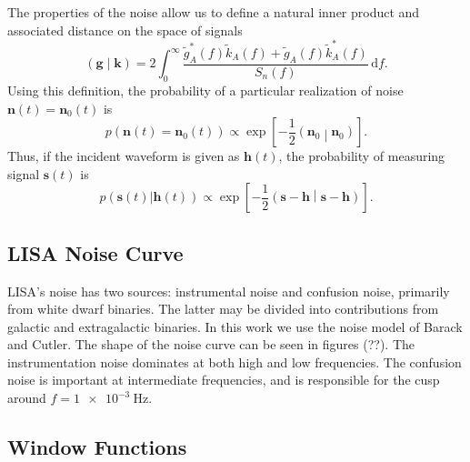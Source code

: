 \documentclass[a4paper, 11pt, titlepage, twoside]{report}
\newcommand{\recip}[1]{\ensuremath{\frac{1}{#1}}}
\newcommand{\innerprod}[2]{\ensuremath{\left({#1}\middle|{#2}\right)}}
\newcommand{\dd}{\ensuremath{\mathrm{d}}}
\newcommand{\intd}[4]{\ensuremath{\int_{#1}^{#2}{#3}\,\dd{#4}}}
\begin{document}
The properties of the noise allow us to define a natural inner product and associated distance on the space of signals\cite{Cutler1994}
\begin{equation}
\innerprod{\boldsymbol{g}}{\boldsymbol{k}} = 2\intd{0}{\infty}{\frac{\tilde{g}_A^*(f)\tilde{k}_A(f) + \tilde{g}_A(f)\tilde{k}_A^*(f)}{S_n(f)}}{f}.
\end{equation}
Using this definition, the probability of a particular realization of noise $\boldsymbol{n}(t) = \boldsymbol{n}_0(t)$ is
\begin{equation}
p(\boldsymbol{n}(t) = \boldsymbol{n}_0(t)) \propto \exp\left[-\recip{2}\innerprod{\boldsymbol{n}_0}{\boldsymbol{n}_0}\right].
\end{equation}
Thus, if the incident waveform is given as $\boldsymbol{h}(t)$, the probability of measuring signal $\boldsymbol{s}(t)$ is
\begin{equation}
p(\boldsymbol{s}(t)|\boldsymbol{h}(t)) \propto \exp\left[-\recip{2}\innerprod{\boldsymbol{s}-\boldsymbol{h}}{\boldsymbol{s}-\boldsymbol{h}}\right].
\label{eq:sig_prob}
\end{equation}

\subsection{LISA Noise Curve}\label{sec:Noise}

LISA's noise has two sources: instrumental noise and confusion noise, primarily from white dwarf binaries. The latter may be divided into contributions from galactic and extragalactic binaries. In this work we use the noise model of Barack and Cutler\cite{Barack2004}. The shape of the noise curve can be seen in figures (??). The instrumentation noise dominates at both high and low frequencies. The confusion noise is important at intermediate frequencies, and is responsible for the cusp around $f = \SI{1e-3}{\Hz}$.

\subsection{Window Functions}
\end{document}
